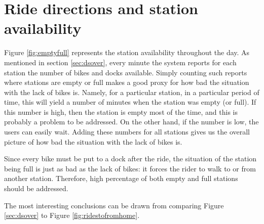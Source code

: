 \documentclass{article}
\begin{document}
\section{Ride directions and station availability}
\label{sec:available}

Figure \ref{fig:emptyfull} represents the station availability throughout the day. As mentioned in section \ref{sec:dsover}, every minute the system reports for each station the number of bikes and docks available. Simply counting such reports where stations are empty or full makes a good proxy for how bad the situation with the lack of bikes is. Namely, for a particular station, in a particular period of time, this will yield a number of minutes when the station was empty (or full). If this number is high, then the station is empty most of the time, and this is probably a problem to be addressed. On the other hand, if the number is low, the users can easily wait. Adding these numbers for all stations gives us the overall picture of how bad the situation with the lack of bikes is.

Since every bike must be put to a dock after the ride, the situation of the station being full is just as bad as the lack of bikes: it forces the rider to walk to or from another station. Therefore, high percentage of both empty and full stations should be addressed.

The most interesting conclusions can be drawn from comparing Figure \ref{sec:dsover} to Figure \ref{fig:ridestofromhome}.
\end{document}
